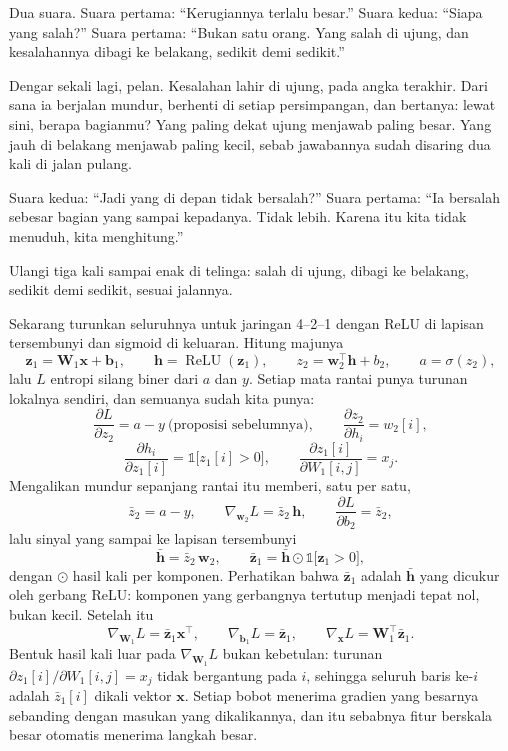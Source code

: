 \begin{bacakeras}
Dua suara. Suara pertama: ``Kerugiannya terlalu besar.'' Suara kedua: ``Siapa yang
salah?'' Suara pertama: ``Bukan satu orang. Yang salah di ujung, dan kesalahannya dibagi
ke belakang, sedikit demi sedikit.''

Dengar sekali lagi, pelan. Kesalahan lahir di ujung, pada angka terakhir. Dari sana ia
berjalan mundur, berhenti di setiap persimpangan, dan bertanya: lewat sini, berapa
bagianmu? Yang paling dekat ujung menjawab paling besar. Yang jauh di belakang menjawab
paling kecil, sebab jawabannya sudah disaring dua kali di jalan pulang.

Suara kedua: ``Jadi yang di depan tidak bersalah?'' Suara pertama: ``Ia bersalah sebesar
bagian yang sampai kepadanya. Tidak lebih. Karena itu kita tidak menuduh, kita
menghitung.''

Ulangi tiga kali sampai enak di telinga: salah di ujung, dibagi ke belakang, sedikit
demi sedikit, sesuai jalannya.
\end{bacakeras}


Sekarang turunkan seluruhnya untuk jaringan 4--2--1 dengan ReLU di lapisan tersembunyi dan
sigmoid di keluaran. Hitung majunya
\[
  \mathbf{z}_{1}=\mathbf{W}_{1}\mathbf{x}+\mathbf{b}_{1},\qquad
  \mathbf{h}=\operatorname{ReLU}(\mathbf{z}_{1}),\qquad
  z_{2}=\mathbf{w}_{2}^{\top}\mathbf{h}+b_{2},\qquad
  a=\sigma(z_{2}),
\]
lalu $L$ entropi silang biner dari $a$ dan $y$. Setiap mata rantai punya turunan lokalnya
sendiri, dan semuanya sudah kita punya:
\[
  \frac{\partial L}{\partial z_{2}}=a-y\ \text{(proposisi sebelumnya)},\qquad
  \frac{\partial z_{2}}{\partial h_{i}}=w_{2}[i],
\]
\[
  \frac{\partial h_{i}}{\partial z_{1}[i]}=\mathbb{1}\bigl[z_{1}[i]>0\bigr],\qquad
  \frac{\partial z_{1}[i]}{\partial W_{1}[i,j]}=x_{j}.
\]
Mengalikan mundur sepanjang rantai itu memberi, satu per satu,
\[
  \bar{z}_{2}=a-y,\qquad
  \nabla_{\mathbf{w}_{2}}L=\bar{z}_{2}\,\mathbf{h},\qquad
  \frac{\partial L}{\partial b_{2}}=\bar{z}_{2},
\]
lalu sinyal yang sampai ke lapisan tersembunyi
\[
  \bar{\mathbf{h}}=\bar{z}_{2}\,\mathbf{w}_{2},
  \qquad
  \bar{\mathbf{z}}_{1}=\bar{\mathbf{h}}\odot\mathbb{1}\bigl[\mathbf{z}_{1}>0\bigr],
\]
dengan $\odot$ hasil kali per komponen. Perhatikan bahwa $\bar{\mathbf{z}}_{1}$ adalah
$\bar{\mathbf{h}}$ yang dicukur oleh gerbang ReLU: komponen yang gerbangnya tertutup menjadi
tepat nol, bukan kecil. Setelah itu
\[
  \nabla_{\mathbf{W}_{1}}L=\bar{\mathbf{z}}_{1}\mathbf{x}^{\top},\qquad
  \nabla_{\mathbf{b}_{1}}L=\bar{\mathbf{z}}_{1},\qquad
  \nabla_{\mathbf{x}}L=\mathbf{W}_{1}^{\top}\bar{\mathbf{z}}_{1}.
\]
Bentuk hasil kali luar pada $\nabla_{\mathbf{W}_{1}}L$ bukan kebetulan: turunan
$\partial z_{1}[i]/\partial W_{1}[i,j]=x_{j}$ tidak bergantung pada $i$, sehingga seluruh
baris ke-$i$ adalah $\bar{z}_{1}[i]$ dikali vektor $\mathbf{x}$. Setiap bobot menerima
gradien yang besarnya sebanding dengan masukan yang dikalikannya, dan itu sebabnya fitur
berskala besar otomatis menerima langkah besar.

